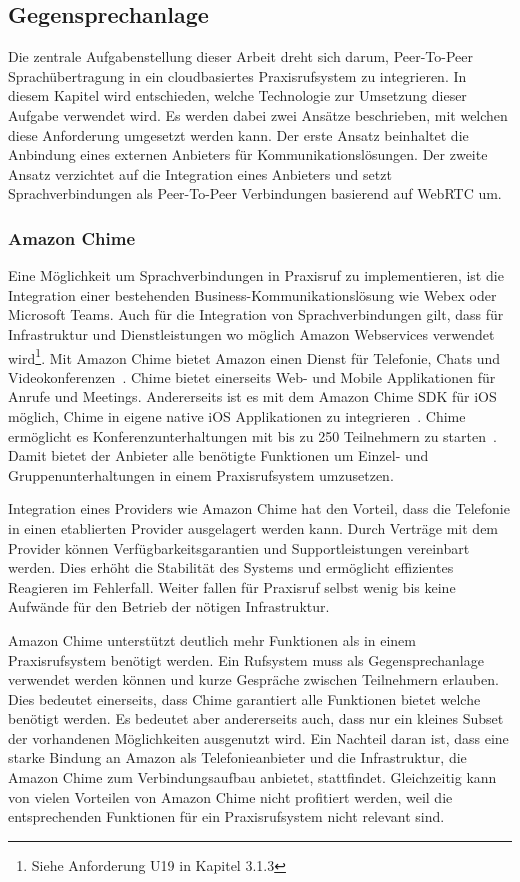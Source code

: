 \subsection{Gegensprechanlage}

Die zentrale Aufgabenstellung dieser Arbeit dreht sich darum, Peer-To-Peer Sprachübertragung in ein cloudbasiertes Praxisrufsystem zu integrieren.
In diesem Kapitel wird entschieden, welche Technologie zur Umsetzung dieser Aufgabe verwendet wird.
Es werden dabei zwei Ansätze beschrieben, mit welchen diese Anforderung umgesetzt werden kann.
Der erste Ansatz beinhaltet die Anbindung eines externen Anbieters für Kommunikationslösungen.
Der zweite Ansatz verzichtet auf die Integration eines Anbieters und setzt Sprachverbindungen als Peer-To-Peer Verbindungen basierend auf WebRTC um.

\subsubsection{Amazon Chime}

Eine Möglichkeit um Sprachverbindungen in Praxisruf zu implementieren, ist die Integration einer bestehenden Business-Kommunikationslösung wie Webex oder Microsoft Teams.
Auch für die Integration von Sprachverbindungen gilt, dass für Infrastruktur und Dienstleistungen wo möglich Amazon Webservices verwendet wird\footnote{Siehe Anforderung U19 in Kapitel 3.1.3}.
Mit Amazon Chime bietet Amazon einen Dienst für Telefonie, Chats und Videokonferenzen~\cite{aws_chime}.
Chime bietet einerseits Web- und Mobile Applikationen für Anrufe und Meetings.
Andererseits ist es mit dem Amazon Chime SDK für iOS möglich, Chime in eigene native iOS Applikationen zu integrieren~\cite{aws_chime_sdk}.
Chime ermöglicht es Konferenzunterhaltungen mit bis zu 250 Teilnehmern zu starten~\cite{aws_faq}.
Damit bietet der Anbieter alle benötigte Funktionen um Einzel- und Gruppenunterhaltungen in einem Praxisrufsystem umzusetzen.

Integration eines Providers wie Amazon Chime hat den Vorteil, dass die Telefonie in einen etablierten Provider ausgelagert werden kann.
Durch Verträge mit dem Provider können Verfügbarkeitsgarantien und Supportleistungen vereinbart werden.
Dies erhöht die Stabilität des Systems und ermöglicht effizientes Reagieren im Fehlerfall.
Weiter fallen für Praxisruf selbst wenig bis keine Aufwände für den Betrieb der nötigen Infrastruktur.

Amazon Chime unterstützt deutlich mehr Funktionen als in einem Praxisrufsystem benötigt werden.
Ein Rufsystem muss als Gegensprechanlage verwendet werden können und kurze Gespräche zwischen Teilnehmern erlauben.
Dies bedeutet einerseits, dass Chime garantiert alle Funktionen bietet welche benötigt werden.
Es bedeutet aber andererseits auch, dass nur ein kleines Subset der vorhandenen Möglichkeiten ausgenutzt wird.
Ein Nachteil daran ist, dass eine starke Bindung an Amazon als Telefonieanbieter und die Infrastruktur, die Amazon Chime zum Verbindungsaufbau anbietet, stattfindet.
Gleichzeitig kann von vielen Vorteilen von Amazon Chime nicht profitiert werden, weil die entsprechenden Funktionen für ein Praxisrufsystem nicht relevant sind.

